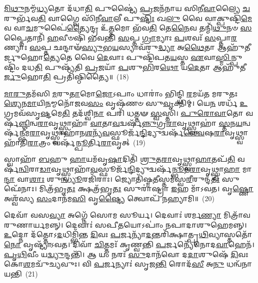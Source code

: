 \-\ul{𑌮𑌿}\-\-\ul{𑌥𑍁}\-𑌨𑌮𑍍𑌮᳴\-\ul{𑌧𑍍𑌯}\-𑌤𑍋 𑌦᳴𑌧𑌾\-\ul{𑌤𑌿} 𑌪𑍁𑌷𑍍𑌟𑍍𑌯𑍈॑ \ul{𑌪𑍍𑌰}\-𑌜𑌨᳴𑌨𑌾𑌯 𑌸𑌿𑌨𑍀\-\ul{𑌵𑌾}\-𑌲𑍍𑌯𑍈 \ul{𑌚}\-𑌰𑍁𑌰𑍍𑌭᳴𑌵\-\ul{𑌤𑌿} 𑌵𑌾𑌗𑍍𑌵𑍈 𑌸𑌿᳴𑌨𑍀\-\ul{𑌵𑌾}\-𑌲𑍀 𑌪𑍁\-\ul{𑌷𑍍𑌟𑌿𑌃} 𑌖\-\ul{𑌲𑍁} 𑌵𑍈 𑌵𑌾𑌕𑍍𑌪𑍁𑌷𑍍𑌟𑌿᳴\-\ul{𑌮𑍇}\-𑌵 𑌵𑌾\-\ul{𑌚}\-𑌮𑍁𑌪𑍈॑\-\ul{𑌤𑍍𑌯𑍈}\-𑌨𑍍𑌦𑍍𑌰 𑌉᳴\-\ul{𑌤𑍍𑌤}\-𑌮𑍋 𑌭᳴𑌵\-\ul{𑌤𑌿} 𑌤𑍇\-\ul{𑌨𑍈}\-𑌵 𑌤𑌨𑍍𑌮𑌿᳴\-\ul{𑌥𑍁}\-𑌨𑍞 \ul{𑌸}\-𑌪𑍍𑌤𑍈𑌤𑌾𑌨𑌿᳴ \ul{𑌹}\-𑌵𑍀𑍞𑌷𑌿᳴ 𑌭𑌵𑌨𑍍𑌤𑌿 \ul{𑌸}\-𑌪𑍍𑌤 \ul{𑌗𑍍𑌰𑌾}\-𑌮𑍍𑌯𑌾𑌃 \ul{𑌪}\-𑌶𑌵𑌃᳴ \ul{𑌸}\-𑌪𑍍𑌤𑌾\-\ul{𑌰}\-𑌣𑍍𑌯𑌾𑌃 \ul{𑌸}\-𑌪𑍍𑌤 𑌛𑌨𑍍𑌦𑌾𑍟᳴\-\ul{𑌸𑍍𑌯𑍁}\-𑌭\-\ul{𑌯}\-𑌸𑍍𑌯𑌾𑌵᳴𑌰𑍁\-\ul{𑌦𑍍𑌧𑍍𑌯𑌾} 𑌅\-\ul{𑌥𑍈}\-𑌤𑌾 𑌆𑌹𑍁᳴𑌤𑍀𑌰𑍍𑌜𑍁𑌹𑍋\-\ul{𑌤𑍍𑌯𑍇}\-𑌤𑍇 𑌵𑍈 \ul{𑌦𑍇}\-𑌵𑌾𑌃 𑌪𑍁𑌷𑍍𑌟𑌿᳴𑌪𑌤\-\ul{𑌯}\-𑌸𑍍𑌤 \ul{𑌏}\-𑌵𑌾\-\ul{𑌸𑍍𑌮𑌿}\-𑌨𑍍𑌪𑍁𑌷𑍍𑌟𑌿𑌂᳴ 𑌦𑌧\-\ul{𑌤𑌿} 𑌪𑍁𑌷𑍍𑌯᳴𑌤𑌿 \ul{𑌪𑍍𑌰}\-𑌜𑌯𑌾᳴ \ul{𑌪}\-𑌶𑍁\-\ul{𑌭𑌿}\-𑌰\-\ul{𑌥𑍋} 𑌯\-\ul{𑌦𑍇}\-𑌤𑌾 𑌆𑌹𑍁᳴𑌤𑍀\-\ul{𑌰𑍍𑌜𑍁}\-𑌹𑍋\-\ul{𑌤𑌿} 𑌪𑍍𑌰𑌤𑌿᳴𑌷𑍍𑌠𑌿𑌤𑍍𑌯𑍈॥~(18)

{\anuvakamend[{\-\ul{𑌅}\-\-\ul{𑌸𑍍𑌮𑍈} 𑌤 \ul{𑌏}\-𑌵 𑌦𑍍𑌵𑌾𑌦᳴𑌶 𑌚}]}%

\-\ul{𑌮𑌾}\-\-\ul{𑌰𑍁}\-𑌤𑌮᳴𑌸𑌿 \ul{𑌮}\-𑌰𑍁\-\ul{𑌤𑌾}\-𑌮𑍋\-\ul{𑌜𑍋}\-\-𑌽𑌪𑌾𑌂 𑌧𑌾𑌰𑌾𑌂॑ 𑌭𑌿𑌨𑍍𑌦𑍍𑌧𑌿 \ul{𑌰}\-𑌮𑌯᳴𑌤 𑌮𑌰𑍁𑌤𑌃 \ul{𑌶𑍍𑌯𑍇}\-𑌨\-\ul{𑌮𑌾}\-𑌯𑌿\-\ul{𑌨}\-𑌮𑍍𑌮𑌨𑍋᳴𑌜𑌵\-\ul{𑌸𑌂} 𑌵𑍃𑌷᳴𑌣𑍞 𑌸𑍁\-\ul{𑌵𑍃}\-𑌕𑍍𑌤𑌿𑌮𑍍। 𑌯𑍇\-\ul{𑌨} 𑌶𑌰𑍍𑌧᳴ \ul{𑌉}\-𑌗𑍍𑌰𑌮𑌵᳴𑌸𑍃\-\ul{𑌷𑍍𑌟}\-𑌮𑍇\-\ul{𑌤𑌿} 𑌤𑌦᳴𑌶𑍍𑌵𑌿\-\ul{𑌨𑌾} 𑌪𑌰𑌿᳴ 𑌧𑌤𑍍𑌤𑍟 \ul{𑌸𑍍𑌵}\-𑌸𑍍𑌤𑌿। \ul{𑌪𑍁}\-\-\ul{𑌰𑍋}\-\-\ul{𑌵𑌾}\-𑌤𑍋 𑌵𑌰𑍍\mbox{}𑌷᳴\-\ul{𑌞𑍍𑌜𑌿}\-𑌨𑍍𑌵\-\ul{𑌰𑌾}\-𑌵𑍃𑌥𑍍𑌸𑍍𑌵𑌾𑌹𑌾᳴ \ul{𑌵𑌾}\-𑌤𑌾\-\ul{𑌵}\-𑌦𑍍𑌵𑌰𑍍\mbox{}𑌷᳴\-\ul{𑌨𑍍𑌨𑍁}\-𑌗𑍍𑌰\-\ul{𑌰𑌾}\-𑌵𑍃𑌥𑍍𑌸𑍍𑌵𑌾𑌹𑌾॑ \ul{𑌸𑍍𑌤}\-𑌨\-\ul{𑌯}\-𑌨𑍍𑌵𑌰𑍍\mbox{}𑌷᳴\-\ul{𑌨𑍍𑌭𑍀}\-𑌮\-\ul{𑌰𑌾}\-𑌵𑍃𑌥𑍍𑌸𑍍𑌵𑌾𑌹𑌾᳴𑌨\-\ul{𑌶}\-𑌨𑍍𑌯᳴\-\ul{𑌵}\-𑌸𑍍𑌫𑍂𑌰𑍍𑌜᳴\-\ul{𑌨𑍍𑌦𑌿}\-𑌦𑍍𑌯𑍁𑌦𑍍𑌵𑌰𑍍\mbox{}𑌷᳴\-\ul{𑌨𑍍𑌤𑍍𑌵𑍇}\-𑌷\-\ul{𑌰𑌾}\-𑌵𑍃𑌥𑍍𑌸𑍍𑌵𑌾𑌹𑌾᳴𑌤𑌿\-\ul{𑌰𑌾}\-𑌤𑍍𑌰𑌂 𑌵𑌰𑍍\mbox{}𑌷᳴\-\ul{𑌨𑍍𑌪𑍂}\-𑌰𑍍𑌤𑌿\-\ul{𑌰𑌾}\-𑌵𑍃𑌤𑍍~(19)

𑌸𑍍𑌵𑌾𑌹𑌾᳴ \ul{𑌬}\-𑌹𑍁 \ul{𑌹𑌾}\-𑌯𑌮᳴𑌵𑍃\-\ul{𑌷𑌾}\-𑌦𑌿𑌤𑌿᳴ \ul{𑌶𑍍𑌰𑍁}\-𑌤\-\ul{𑌰𑌾}\-𑌵𑍃𑌥𑍍𑌸𑍍𑌵𑌾\-\ul{𑌹𑌾}\-𑌤𑌪᳴\-\ul{𑌤𑌿} 𑌵𑌰𑍍\mbox{}𑌷᳴\-\ul{𑌨𑍍𑌵𑌿}\-𑌰𑌾\-\ul{𑌡𑌾}\-𑌵𑍃𑌥𑍍𑌸𑍍𑌵𑌾𑌹𑌾᳴\-\ul{𑌵}\-𑌸𑍍𑌫𑍂𑌰𑍍𑌜᳴\-\ul{𑌨𑍍𑌦𑌿}\-𑌦𑍍𑌯𑍁𑌦𑍍𑌵𑌰𑍍\mbox{}𑌷᳴\-\ul{𑌨𑍍𑌭𑍂}\-𑌤\-\ul{𑌰𑌾}\-𑌵𑍃𑌥𑍍𑌸𑍍𑌵𑌾\-\ul{𑌹𑌾} 𑌮𑌾\-\ul{𑌨𑍍𑌦𑌾} 𑌵𑌾\-\ul{𑌶𑌾𑌃} 𑌶𑍁\-\ul{𑌨𑍍𑌧𑍍𑌯𑍂}\-𑌰𑌜𑌿᳴𑌰𑌾𑌃। 𑌜𑍍𑌯𑍋𑌤𑌿᳴𑌷𑍍𑌮\-\ul{𑌤𑍀}\-𑌸𑍍𑌤𑌮᳴𑌸𑍍𑌵\-\ul{𑌰𑍀}\-𑌰𑍁𑌨𑍍𑌦᳴\-\ul{𑌤𑍀𑌃} 𑌸𑍁𑌫𑍇᳴𑌨𑌾𑌃। 𑌮𑌿𑌤𑍍𑌰᳴𑌭𑍃\-\ul{𑌤𑌃} 𑌕𑍍𑌷𑌤𑍍𑌰᳴𑌭𑍃\-\ul{𑌤𑌃} 𑌸𑍁𑌰𑌾॑𑌷𑍍𑌟𑍍𑌰𑌾 \ul{𑌇}\-𑌹 𑌮𑌾᳴\-𑌽𑌵𑌤। 𑌵𑍃\-\ul{𑌷𑍍𑌣𑍋} 𑌅𑌶𑍍𑌵᳴𑌸𑍍𑌯 \ul{𑌸𑌂}\-𑌦𑌾𑌨᳴𑌮\-\ul{𑌸𑌿} 𑌵𑍃\-\ul{𑌷𑍍𑌟𑍍𑌯𑍈} 𑌤𑍍𑌵𑍋𑌪᳴ 𑌨𑌹𑍍𑌯𑌾𑌮𑌿॥~(20)

{\anuvakamend[{\-\ul{𑌪𑍂}\-𑌰𑍍𑌤𑌿\-\ul{𑌰𑌾}\-𑌵𑍃𑌦𑍍𑌦𑍍𑌵𑌿𑌚᳴𑌤𑍍𑌵𑌾𑌰𑌿𑍞𑌶𑌚𑍍𑌚}]}%

𑌦𑍇𑌵𑌾᳴ 𑌵𑌸\-\ul{𑌵𑍍𑌯𑌾} 𑌅𑌗𑍍𑌨𑍇᳴ 𑌸𑍋𑌮 𑌸𑍂𑌰𑍍𑌯। 𑌦𑍇𑌵𑌾𑌃॑ 𑌶𑌰𑍍𑌮\-\ul{𑌣𑍍𑌯𑌾} 𑌮𑌿𑌤𑍍𑌰𑌾᳴𑌵𑌰𑍁𑌣𑌾𑌰𑍍𑌯𑌮𑌨𑍍𑌨𑍍। 𑌦𑍇𑌵𑌾𑌃॑ 𑌸𑌪𑍀\-\ul{𑌤}\-𑌯𑍋\-𑌽𑌪𑌾𑌂॑ 𑌨𑌪𑌾𑌦𑌾𑌶𑍁𑌹𑍇𑌮𑌨𑍍𑌨𑍍। \ul{𑌉}\-𑌦𑍍𑌨𑍋 𑌦᳴𑌤𑍍𑌤𑍋\-𑌽\-\ul{𑌦}\-𑌧𑌿𑌮𑍍𑌭𑌿᳴𑌨𑍍𑌤 \ul{𑌦𑌿}\-𑌵𑌃 \ul{𑌪}\-𑌰𑍍𑌜𑌨𑍍𑌯𑌾᳴\-\ul{𑌦}\-𑌨𑍍𑌤𑌰𑌿᳴𑌕𑍍𑌷𑌾𑌤𑍍𑌪𑍃\-\ul{𑌥𑌿}\-𑌵𑍍𑌯𑌾𑌸𑍍𑌤𑌤𑍋᳴ \ul{𑌨𑍋} 𑌵𑍃𑌷𑍍𑌟𑍍𑌯𑌾᳴\-𑌽𑌵𑌤। 𑌦𑌿𑌵𑌾᳴ \ul{𑌚𑌿}\-𑌤𑍍𑌤𑌮𑌃᳴ 𑌕𑍃𑌣𑍍𑌵𑌨𑍍𑌤𑌿 \ul{𑌪}\-𑌰𑍍𑌜𑌨𑍍𑌯𑍇᳴𑌨𑍋𑌦\-\ul{𑌵𑌾}\-𑌹𑍇𑌨᳴। \ul{𑌪𑍃}\-\-\ul{𑌥𑌿}\-𑌵𑍀𑌂 𑌯\-\ul{𑌦𑍍𑌵𑍍𑌯𑍁}\-𑌨𑍍𑌦𑌨𑍍𑌤𑌿᳴। 𑌆 𑌯𑌂 𑌨𑌰𑌃᳴ \ul{𑌸𑍁}\-𑌦𑌾𑌨᳴𑌵𑍋 𑌦\-\ul{𑌦𑌾}\-𑌶𑍁𑌷𑍇᳴ \ul{𑌦𑌿}\-𑌵𑌃 𑌕𑍋\-\ul{𑌶}\-𑌮𑌚𑍁᳴𑌚𑍍𑌯𑌵𑍁𑌃। 𑌵𑌿 \ul{𑌪}\-𑌰𑍍𑌜𑌨𑍍𑌯𑌾𑌃॑ 𑌸𑍃𑌜\-\ul{𑌨𑍍𑌤𑌿} 𑌰𑍋𑌦᳴\-\ul{𑌸𑍀} 𑌅\-\ul{𑌨𑍁} 𑌧𑌨𑍍𑌵᳴𑌨𑌾 𑌯𑌨𑍍𑌤𑌿~(21)

